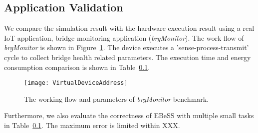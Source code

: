 \subsection{Application Validation}
We compare the simulation result with the hardware execution result using a real IoT application, bridge monitoring application (\emph{brgMonitor}).
The work flow of \emph{brgMonitor} is shown in Figure~\ref{fig:BrgMonitor}.
The device executes a 'sense-process-transmit' cycle to collect bridge health related parameters.
The execution time and energy consumption comparison is shown in Table~\ref{}.

\begin{figure}[!htpb]
	\centering
	\vspace{-5pt}
	\texttt{[image: VirtualDeviceAddress]}
	\vspace{-5pt}
	\caption{The working flow and parameters of \emph{brgMonitor} benchmark.}	\label{fig:BrgMonitor}
\end{figure}

Furthermore, we also evaluate the correctness of EBeSS with multiple small tasks in Table~\ref{}.
The maximum error is limited within XXX.

%
%

\begin{comment}

 
\end{comment}